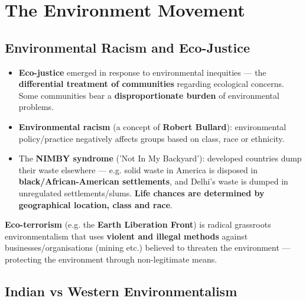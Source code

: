 \chapter{The Environment Movement}

\section{Environmental Racism and Eco-Justice}

\begin{KeyConcept}
\begin{itemize}
\item \textbf{Eco-justice} emerged in response to environmental inequities --- the \textbf{differential treatment of communities} regarding ecological concerns. Some communities bear a \textbf{disproportionate burden} of environmental problems.
\item \textbf{Environmental racism} (a concept of \textbf{Robert Bullard}): environmental policy/practice negatively affects groups based on class, race or ethnicity.
\item The \textbf{NIMBY syndrome} ('Not In My Backyard'): developed countries dump their waste elsewhere --- e.g. solid waste in America is disposed in \textbf{black/African-American settlements}, and Delhi's waste is dumped in unregulated settlements/slums. \textbf{Life chances are determined by geographical location, class and race}.
\end{itemize}
\end{KeyConcept}

\begin{ExampleBox}
\textbf{Eco-terrorism} (e.g. the \textbf{Earth Liberation Front}) is radical grassroots environmentalism that uses \textbf{violent and illegal methods} against businesses/organisations (mining etc.) believed to threaten the environment --- protecting the environment through non-legitimate means.
\end{ExampleBox}

\section{Indian vs Western Environmentalism}

